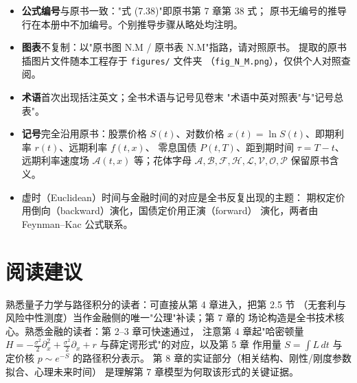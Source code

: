 \begin{itemize}[itemsep=0.2em]
\item \textbf{公式编号}与原书一致："式 (7.38)"即原书第 7 章第 38 式；
      原书无编号的推导行在本册中不加编号。个别推导步骤从略处均注明。
\item \textbf{图表}不复制：以"原书图 N.M / 原书表 N.M"指路，请对照原书。
      提取的原书插图片文件随本工程存于 \texttt{figures/} 文件夹
      （\texttt{fig\_N\_M.png}），仅供个人对照查阅。
\item \textbf{术语}首次出现括注英文；全书术语与记号见卷末
      "术语中英对照表"与"记号总表"。
\item \textbf{记号}完全沿用原书：股票价格 $S(t)$、对数价格
      $x(t)=\ln S(t)$、即期利率 $r(t)$、远期利率 $f(t,x)$、
      零息国债 $P(t,T)$、距到期时间 $\tau=T-t$、远期利率速度场
      $\mathcal{A}(t,x)$ 等；花体字母
      $\mathcal{A},\mathcal{B},\mathcal{F},\mathcal{H},\mathcal{L},
      \mathcal{V},\mathcal{O},\mathcal{P}$ 保留原书含义。
\item 虚时（Euclidean）时间与金融时间的对应是全书反复出现的主题：
      期权定价用倒向（backward）演化，国债定价用正演（forward）
      演化，两者由 Feynman--Kac 公式联系。
\end{itemize}

\section*{阅读建议}

熟悉量子力学与路径积分的读者：可直接从第 4 章进入，把第 2.5 节
（无套利与风险中性测度）当作金融侧的唯一"公理"补读；第 7 章的
场论构造是全书技术核心。熟悉金融的读者：第 2--3 章可快速通过，
注意第 4 章起"哈密顿量 $H = -\frac{\sigma^2}{2}\partial_x^2 +
\frac{\sigma^2}{2}\partial_x + r$ 与薛定谔形式"的对应，以及第 5 章
作用量 $S = \int L\,dt$ 与定价核 $p \sim e^{-S}$ 的路径积分表示。
第 8 章的实证部分（相关结构、刚性/刚度参数拟合、心理未来时间）
是理解第 7 章模型为何取该形式的关键证据。
